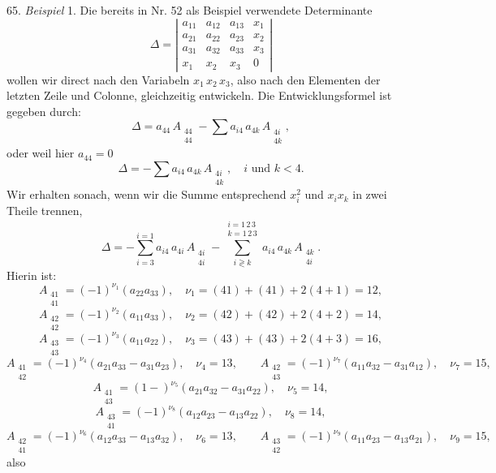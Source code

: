 65. \textit{Beispiel} 1. Die bereits in Nr. 52 als Beispiel verwendete Determinante
\[
\Delta = \left|\begin{array}{cccc}
a_{11} & a_{12} & a_{13} & x_1\\
a_{21} & a_{22} & a_{23} & x_2\\
a_{31} & a_{32} & a_{33} & x_3\\
x_1 & x_2 & x_3 & 0
\end{array}\right|
\]
wollen wir direct nach den Variabeln $x_1\,x_2\,x_3$, also nach den Elementen der letzten Zeile und Colonne, gleichzeitig entwickeln. Die Entwicklungsformel ist gegeben durch:
\[
\Delta = a_{44}\,A_{\substack{44\\44}} - \sum a_{i4}\,a_{4k}\,A_{\substack{4i\\4k}},
\]
oder weil hier $a_{44}=0$
\[
\Delta = -\sum a_{i4}\,a_{4k}\,A_{\substack{4i\\4k}},\quad i \text{ und } k<4.
\]
Wir erhalten sonach, wenn wir die Summe entsprechend $x_i^2$ und $x_i x_k$ in zwei Theile trennen,
\[
\Delta = -\sum_{i=3}^{i=1} a_{i4}\,a_{4i}\,A_{\substack{4i\\4i}} - \sum_{i\gtrless k}^{\substack{i=1\,2\,3\\k=1\,2\,3}} a_{i4}\,a_{4k}\,A_{\substack{4k\\4i}}.
\]
Hierin ist:
\[
A_{\substack{41\\41}} = (-1)^{\nu_1}(a_{22}a_{33}),\quad \nu_1=(41)+(41)+2(4+1)=12,
\]
\[
A_{\substack{42\\42}} = (-1)^{\nu_2}(a_{11}a_{33}),\quad \nu_2=(42)+(42)+2(4+2)=14,
\]
\[
A_{\substack{43\\43}} = (-1)^{\nu_3}(a_{11}a_{22}),\quad \nu_3=(43)+(43)+2(4+3)=16,
\]
\[
A_{\substack{41\\42}} = (-1)^{\nu_4}(a_{21}a_{33}-a_{31}a_{23}),\quad \nu_4=13,\qquad
A_{\substack{42\\43}} = (-1)^{\nu_7}(a_{11}a_{32}-a_{31}a_{12}),\quad \nu_7=15,
\]
\[
A_{\substack{41\\43}} = (1-)^{\nu_5}(a_{21}a_{32}-a_{31}a_{22}),\quad \nu_5=14,
\] %
\[
A_{\substack{43\\41}} = (-1)^{\nu_8}(a_{12}a_{23}-a_{13}a_{22}),\quad \nu_8=14,
\]
\[
A_{\substack{42\\41}} = (-1)^{\nu_6}(a_{12}a_{33}-a_{13}a_{32}),\quad \nu_6=13,\qquad
A_{\substack{43\\42}} = (-1)^{\nu_9}(a_{11}a_{23}-a_{13}a_{21}),\quad \nu_9=15,
\]
also


